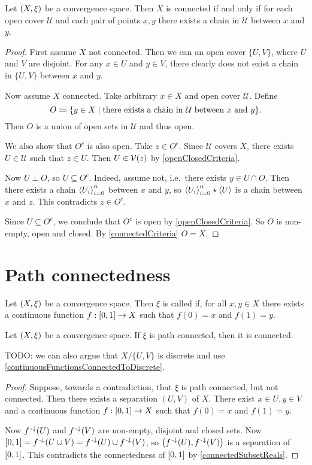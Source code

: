 \begin{proposition} \label{connectedChains}
Let $\sSet{X,\xi}$ be a convergence space. Then $X$ is connected \textup{if and only if} for each open cover $\mathcal{U}$ and each pair of points $x,y$ there exists a chain in $\mathcal{U}$ between $x$ and $y$.
\end{proposition}
\begin{proof}
First assume $X$ not connected. Then we can an open cover $\{U,V\}$, where $U$ and $V$ are disjoint. For any $x\in U$ and $y\in V$, there clearly does not exist a chain in $\{U,V\}$ between $x$ and $y$.

Now assume $X$ connected. Take arbitrary $x\in X$ and open cover $\mathcal{U}$. Define
\[ O \defeq \setbuilder{y\in X}{\text{there exists a chain in $\mathcal{U}$ between $x$ and $y$}}. \]
Then $O$ is a union of open sets in $\mathcal{U}$ and thus open.

We also show that $O^c$ is also open. Take $z\in O^c$. Since $\mathcal{U}$ covers $X$, there exists $U\in\mathcal{U}$ such that $z\in U$. Then $U\in \operatorname{\mathcal{V}}(z)$ by \ref{openClosedCriteria}.

Now $U\perp O$, so $U\subseteq O^c$. Indeed, assume not, i.e.\ there exists $y\in U\cap O$. Then there exists a chain $\left\langle U_{i} \right\rangle_{i=0}^n$ between $x$ and $y$, so $\left\langle U_{i} \right\rangle_{i=0}^n\star\left\langle U \right\rangle$ is a chain between $x$ and $z$. This contradicts $z\in O^c$.

Since $U\subseteq O^c$, we conclude that $O^c$ is open by \ref{openClosedCriteria}. So $O$ is non-empty, open and closed. By \ref{connectedCriteria} $O = X$.
\end{proof}


\section{Path connectedness}
\begin{definition}
Let $\sSet{X,\xi}$ be a convergence space. Then $\xi$ is called  if, for all $x,y\in X$ there exists a continuous function $f:\interval{0,1}\to X$ such that $f(0) = x$ and $f(1) = y$.
\end{definition}

\begin{lemma}
Let $\sSet{X,\xi}$ be a convergence space. If $\xi$ is path connected, then it is connected.
\end{lemma}
TODO: we can also argue that $X/\{U,V\}$ is discrete and use \ref{continuousFunctionsConnectedToDiscrete}.
\begin{proof}
Suppose, towards a contradiction, that $\xi$ is path connected, but not connected. Then there exists a separation $(U,V)$ of $X$. There exist $x\in U, y\in V$ and a continuous function $f: \interval{0,1}\to X$ such that $f(0)=x$ and $f(1) = y$.

Now $f^{\text{\hspace{0.15em}-}\downarrow}(U)$ and $f^{\text{\hspace{0.15em}-}\downarrow}(V)$ are non-empty, disjoint and closed sets. Now $\interval{0,1} = f^\preimf(U\cup V) = f^\preimf(U)\cup f^\preimf(V)$, so $\big(f^{\text{\hspace{0.15em}-}\downarrow}(U), f^{\text{\hspace{0.15em}-}\downarrow}(V)\big)$ is a separation of $\interval{0,1}$. This contradicts the connectedness of $\interval{0,1}$ by \ref{connectedSubsetReals}.
\end{proof}

